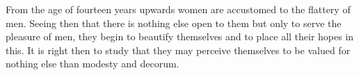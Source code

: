 From the age of fourteen years upwards  women are accustomed to the flattery of
men. Seeing then that there is nothing else  open to them but only to serve the
pleasure of men, they begin to beautify themselves and to place all their hopes
in this.  It is right  then to  study that they  may perceive themselves  to be
valued for nothing else than modesty and decorum.
